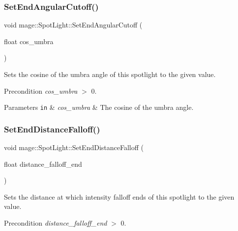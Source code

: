 \subsubsection{\texorpdfstring{Set\+End\+Angular\+Cutoff()}{SetEndAngularCutoff()}}
{\footnotesize\ttfamily void mage\+::\+Spot\+Light\+::\+Set\+End\+Angular\+Cutoff (\begin{DoxyParamCaption}\item[{float}]{cos\+\_\+umbra }\end{DoxyParamCaption})\hspace{0.3cm}{\ttfamily [noexcept]}}

Sets the cosine of the umbra angle of this spotlight to the given value.

\begin{DoxyPrecond}{Precondition}
{\itshape cos\+\_\+umbra} $>$ 0. 
\end{DoxyPrecond}

\begin{DoxyParams}[1]{Parameters}
\mbox{\tt in}  & {\em cos\+\_\+umbra} & The cosine of the umbra angle. \\
\hline
\end{DoxyParams}
\hypertarget{classmage_1_1_spot_light_ad0ed513c07128338abd8b23295004456}{}\label{classmage_1_1_spot_light_ad0ed513c07128338abd8b23295004456} 
\subsubsection{\texorpdfstring{Set\+End\+Distance\+Falloff()}{SetEndDistanceFalloff()}}
{\footnotesize\ttfamily void mage\+::\+Spot\+Light\+::\+Set\+End\+Distance\+Falloff (\begin{DoxyParamCaption}\item[{float}]{distance\+\_\+falloff\+\_\+end }\end{DoxyParamCaption})\hspace{0.3cm}{\ttfamily [noexcept]}}

Sets the distance at which intensity falloff ends of this spotlight to the given value.

\begin{DoxyPrecond}{Precondition}
{\itshape distance\+\_\+falloff\+\_\+end} $>$ 0. 
\end{DoxyPrecond}

